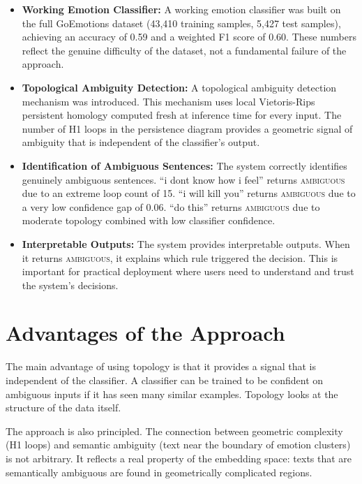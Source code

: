 \begin{itemize}
    \item \textbf{Working Emotion Classifier:} A working emotion classifier was built on the full GoEmotions dataset (43,410 training samples, 5,427 test samples), achieving an accuracy of 0.59 and a weighted F1 score of 0.60. These numbers reflect the genuine difficulty of the dataset, not a fundamental failure of the approach.

    \item \textbf{Topological Ambiguity Detection:} A topological ambiguity detection mechanism was introduced. This mechanism uses local Vietoris-Rips persistent homology computed fresh at inference time for every input. The number of H1 loops in the persistence diagram provides a geometric signal of ambiguity that is independent of the classifier's output.

    \item \textbf{Identification of Ambiguous Sentences:} The system correctly identifies genuinely ambiguous sentences. ``i dont know how i feel'' returns \textsc{ambiguous} due to an extreme loop count of 15. ``i will kill you'' returns \textsc{ambiguous} due to a very low confidence gap of 0.06. ``do this'' returns \textsc{ambiguous} due to moderate topology combined with low classifier confidence.

    \item \textbf{Interpretable Outputs:} The system provides interpretable outputs. When it returns \textsc{ambiguous}, it explains which rule triggered the decision. This is important for practical deployment where users need to understand and trust the system's decisions.
\end{itemize}

\section{Advantages of the Approach}

The main advantage of using topology is that it provides a signal that is independent of the
classifier. A classifier can be trained to be confident on ambiguous inputs if it has seen many
similar examples. Topology looks at the structure of the data itself.

The approach is also principled. The connection between geometric complexity (H1 loops) and
semantic ambiguity (text near the boundary of emotion clusters) is not arbitrary. It reflects a
real property of the embedding space: texts that are semantically ambiguous are found in
geometrically complicated regions.


